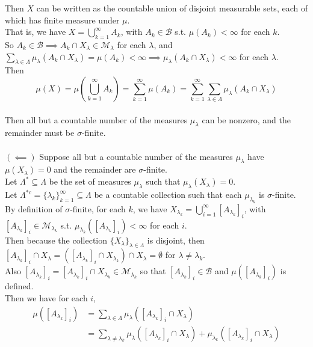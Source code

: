 \begin{enumerate}
\begin{enumerate}[label=(\roman*),align=left]
		Then $X$ can be written as the countable union of disjoint measurable sets, each of which has finite measure under $\mu$.
		\\That is, we have $X=\bigcup_{k=1}^\infty A_k$, with $A_k\in\mathcal{B}$ s.t. $\mu(A_k)<\infty$ for each $k$.
		\\So $A_k\in\mathcal{B}\implies A_k\cap X_\lambda\in\mathcal{M}_\lambda$ for each $\lambda$, and $\sum_{\lambda\in\Lambda} \mu_\lambda(A_k\cap X_\lambda)=\mu(A_k)<\infty\implies\mu_\lambda(A_k\cap X_\lambda)<\infty$ for each $\lambda$.
		\\Then 
		\[
			\mu(X)=\mu(\bigcup_{k=1}^\infty A_k)=\sum_{k=1}^\infty\mu(A_k)=\sum_{k=1}^\infty\sum_{\lambda\in\Lambda} \mu_\lambda(A_k\cap X_\lambda)
		\]
		\\Then all but a countable number of the measures $\mu_\lambda$ can be nonzero, and the remainder must be $\sigma$-finite.\\
		\\$(\impliedby)$ Suppose all but a countable number of the measures $\mu_\lambda$ have $\mu(X_\lambda)=0$ and the remainder are $\sigma$-finite.\\
		Let $\Lambda^*\subseteq\Lambda$ be the set of measures $\mu_\lambda$ such that $\mu_\lambda(X_\lambda)=0$.
		\\Let $\Lambda^{*c}=\{\lambda_k\}_{k=1}^\infty\subseteq\Lambda$ be a countable collection such that each $\mu_{\lambda_k}$ is $\sigma$-finite.
		\\By definition of $\sigma$-finite, for each $k$, we have $X_{\lambda_k}=\bigcup_{i=1}^\infty [A_{\lambda_k}]_i$, with $[A_{\lambda_k}]_i\in\mathcal{M}_{\lambda_k}$ s.t. $\mu_{\lambda_k}([A_{\lambda_k}]_i)<\infty$ for each $i$.
		\\Then because the collection $\{X_\lambda\}_{\lambda\in\Lambda}$ is disjoint, then $[A_{\lambda_k}]_i\cap X_\lambda=([A_{\lambda_k}]_i\cap X_{\lambda_k})\cap X_\lambda=\emptyset$ for $\lambda\neq\lambda_k$.
		\\Also $[A_{\lambda_k}]_i=[A_{\lambda_k}]_i\cap X_{\lambda_k}\in\mathcal{M}_{\lambda_k}$ so that $[A_{\lambda_k}]_i\in\mathcal{B}$ and $\mu([A_{\lambda_k}]_i)$ is defined.
		\\Then we have for each $i$,
		\begin{align*}
			\mu([A_{\lambda_k}]_i)&=\sum_{\lambda\in\Lambda} \mu_\lambda([A_{\lambda_k}]_i\cap X_\lambda)\\
			&=\sum_{\lambda\neq\lambda_k} \mu_\lambda([A_{\lambda_k}]_i\cap X_\lambda)+\mu_{\lambda_k}([A_{\lambda_k}]_i\cap X_\lambda)\\

\end{align*}
\end{enumerate}
\end{enumerate}

